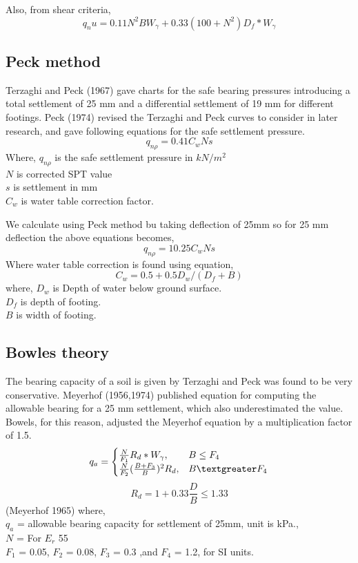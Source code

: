 Also, from shear criteria,
\begin{equation}
q_nu = 0.11 N^2 B {W_\gamma} + 0.33 (100+N^2)D_f*{W_\gamma}
\end{equation}

\subsection{Peck method}
Terzaghi and Peck (1967) gave charts for the safe bearing pressures introducing a total settlement of 25 mm and a differential settlement of 19 mm for different footings. Peck  (1974) revised the Terzaghi and Peck curves to consider in later research, and gave following equations for the safe settlement pressure.\cite{arora_soil_2004}
\begin{equation}
q_{n\rho} = 0.41 C_w Ns
\end{equation}
Where,
 $q_{n\rho}$ is the safe settlement pressure in $kN/m^2$\\
 $N$ is corrected SPT value\\
 $s$ is settlement in mm\\
 $C_w$ is water table correction factor.
 
We calculate using Peck method bu taking deflection of 25mm so for 25 mm deflection the above equations becomes,
\begin{equation}
q_{n\rho} = 10.25 C_w Ns
\end{equation}
Where water table correction is found using equation,
\begin{equation}
C_w=0.5+0.5 D_w / (D_f + B)
\end{equation}
where,
$D_w$ is Depth of water below ground surface.\\
$D_f$  is depth of footing.\\
$B$ is width of footing.

\subsection{Bowles theory}
The bearing capacity of a soil is given by Terzaghi and Peck was found to be very conservative. Meyerhof (1956,1974) published equation for computing the allowable bearing for a 25 mm settlement, which also underestimated the value. Bowels, for this reason, adjusted the Meyerhof equation by a multiplication factor of 1.5.
\begin{equation}
q_a = \begin{cases}
			\frac{N}{F_1} R_d * W_\gamma, & B \le F_4 \\
			\frac{N}{F_2}(\frac{B+F_3}{B})^2 R_d, & B \textgreater F_4
		\end{cases}
\end{equation}
\begin{equation}
R_d = 1 + 0.33 \frac{D}{B} \le 1.33 
\end{equation} (Meyerhof 1965)
where,\\
$q_a$  = allowable bearing capacity for settlement of 25mm, unit is kPa.,\\
$N$ = For $E_r$ 55\\
$F_1$ = 0.05, $F_2$ = 0.08, $F_3$ = 0.3 ,and $F_4$ = 1.2, for SI units.

